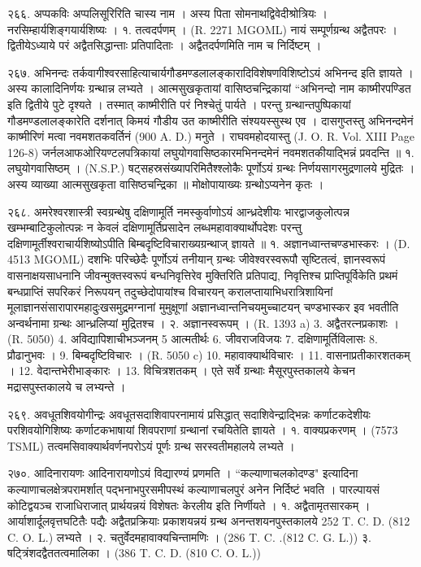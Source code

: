 २६६. अप्पकविः
अप्पलिसूरिरिति चास्य नाम । अस्य पिता सोमनाथद्विवेदीश्रोत्रियः । नरसिम्हार्यशिङ्गयार्यशिष्यः ।
१. तत्वदर्पणम् । (R. 2271 MGOML) नायं सम्पूर्णग्रन्थ अद्वैतपरः । द्वितीयेऽध्याये परं अद्वैतसिद्धान्ताः प्रतिपादिताः । अद्वैतदर्पणमिति नाम च निर्दिष्टम् ।

२६७. अभिनन्दः
तर्कवागीश्वरसाहित्याचार्यगौडमण्डलालङ्कारादिविशेषणविशिष्टोऽयं अभिनन्द इति ज्ञायते । अस्य कालादिनिर्णयः ग्रन्थान्न लभ्यते । आत्मसुखकृतायां वासिष्ठचन्द्रिकायां ``अभिनन्दो नाम काष्मीरपण्डित इति द्वितीये पुटे दृश्यते । तस्मात् काष्मीरीति परं निश्चेतुं पार्यते । परन्तु ग्रन्थान्तपुष्पिकायां गौडमण्डलालङ्कारेति दर्शनात् किमयं गौडीय उत काष्मीरीति संश्ययस्सुस्थ एव । दासगुप्तस्तु अभिनन्दमेनं काष्मीरिणं मत्वा नवमशतकवर्तिनं (900 A. D.) मनुते । राघवमहोदयास्तु (J. O. R. Vol. XIII Page 126-8) जर्नलआफओरियण्टलपत्रिकायां लघुयोगवासिष्ठकारमभिनन्दमेनं नवमशतकीयाद्भिन्नं प्रवदन्ति ॥
१. लघुयोगवासिष्ठम् । (N.S.P.)
षट्सहस्रसंख्यापरिमितैश्श्लोकैः पूर्णोऽयं ग्रन्थः निर्णयसागरमुद्रणालये मुद्रितः । अस्य व्याख्या आत्मसुखकृता वासिष्ठचन्द्रिका ॥ मोक्षोपायाख्यः ग्रन्थोऽप्यनेन कृतः । 

२६८. अमरेश्वरशास्त्री
स्वग्रन्थेषु दक्षिणामूर्ति नमस्कुर्वाणोऽयं आन्ध्रदेशीयः भारद्वाजकुलोत्पन्न खम्भम्बाटिकुलोत्पन्नः न केवलं दक्षिणामूर्तिप्रसादेन लब्धमहावाक्यार्थोपदेशः परन्तु दक्षिणामूर्तीश्वराचार्यशिष्योऽपीति बिम्बदृष्टिविचाराख्यग्रन्थाज् ज्ञायते ॥
१. अज्ञानध्वान्तचण्डभास्करः । (D. 4513 MGOML) दशभिः परिच्छेदैः पूर्णोऽयं तनीयान् ग्रन्थः जीवेश्वरस्वरूपौ सृष्टितत्वं, ज्ञानस्वरूपं वासनाक्षयसाधनानि जीवन्मुक्तस्वरूपं बन्धनिवृत्तिरेव मुक्तिरिति प्रतिपाद्य, निवृत्तिश्च प्राप्तिपूर्विकेति प्रथमं बन्धप्राप्तिं सपरिकरं निरूपयन् तदुच्छेदोपायांश्च विचारयन् करालप्तायाभिधरात्रिशायिनां मूलाज्ञानसंसारापारमहादुःखसमुद्रमग्नानां मुमुक्षूणां अज्ञानध्वान्तनिचयमुच्चाटयन् चण्डभास्कर इव भवतीति अन्वर्थनामा ग्रन्थः आन्ध्रलिप्यां मुद्रितश्च ।
२. अज्ञानस्वरूपम् । (R. 1393 a) 3. अद्वैतरत्नप्रकाशः । (R. 5050) 4. अविद्यापिशाचीभञ्जनम् 5 आत्मतीर्थः 6. जीवराजविजयः 7. दक्षिणामूर्तिविलासः 8. प्रौढानुभवः । 9. बिम्बदृष्टिविचारः । (R. 5050 c) 10. महावाक्यार्थविचारः । 11. वासनाप्रतीकारशतकम् । 12. वेदान्तभेरीभाङ्कारः । 13. विचित्रशतकम् । एते सर्वे ग्रन्थाः मैसूरपुस्तकालये केचन मद्रासपुस्तकालये च लभ्यन्ते ।

२६९. अवधूतशिवयोगीन्द्रः
अवधूतसदाशिवापरनामायं प्रसिद्धात् सदाशिवेन्द्राद्भिन्नः कर्णाटकदेशीयः परशिवयोगिशिष्यः कर्णाटकभाषायां शिवपराणां ग्रन्थानां रचयितेति ज्ञायते ।
१. वाक्यप्रकरणम् । (7573 TSML) तत्वमसिवाक्यार्थवर्णनपरोऽयं पूर्णः ग्रन्थ सरस्वतीमहालये लभ्यते ।

२७०. आदिनारायणः
आदिनारायणोऽयं विद्यारण्यं प्रणमति । ``कल्याणाचलकोदण्ड" इत्यादिना कल्याणाचलक्षेत्रपरामर्शात् पद्भनाभपुरसमीपस्थं कल्याणाचलपुरं अनेन निर्दिष्टं भवति । पारल्पायसं कोटिद्वयञ्च राजाधिराजात् प्रार्थयन्नयं विशेषतः केरलीय इति निर्णीयते ।
१. अद्वैतामृतसारकम् । आर्याशार्दूलवृत्तघटितैः पद्यैः अद्वैतप्रक्रियाः प्रकाशयन्नयं ग्रन्थ अनन्तशयनपुस्तकालये 252 T. C. D. (812 C. O. L.) लभ्यते ।
२. चतुर्वेदमहावाक्यचिन्तामणिः । (286 T. C. .(812 C. G. L.))
३. षट्त्रिंशदद्वैततत्वमालिका । (386 T. C. D. (810 C. O. L.))

